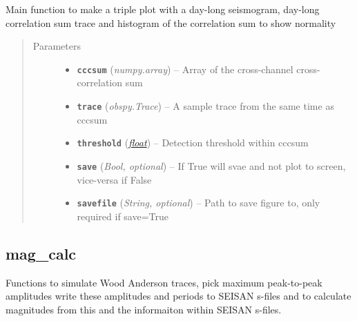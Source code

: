 \documentclass[a4paper,10pt,english]{sphinxmanual}
\begin{document}

\begin{fulllineitems}
\label{utils:EQcorrscan_plotting.triple_plot}
Main function to make a triple plot with a day-long seismogram, day-long
correlation sum trace and histogram of the correlation sum to show normality
\begin{quote}\begin{description}
\item[{Parameters}] \leavevmode\begin{itemize}
\item {} 
\textbf{\texttt{cccsum}} (\emph{numpy.array}) -- Array of the cross-channel cross-correlation sum

\item {} 
\textbf{\texttt{trace}} (\emph{obspy.Trace}) -- A sample trace from the same time as cccsum

\item {} 
\textbf{\texttt{threshold}} (\href{https://docs.python.org/library/functions.html\#float}{\emph{float}}) -- Detection threshold within cccsum

\item {} 
\textbf{\texttt{save}} (\emph{Bool, optional}) -- If True will svae and not plot to screen, vice-versa if False

\item {} 
\textbf{\texttt{savefile}} (\emph{String, optional}) -- Path to save figure to, only required if save=True

\end{itemize}

\end{description}\end{quote}

\end{fulllineitems}



\subsection{mag\_calc}
\label{utils:module-mag_calc}\label{utils:mag-calc}
Functions to simulate Wood Anderson traces, pick maximum peak-to-peak amplitudes
write these amplitudes and periods to SEISAN s-files and to calculate magnitudes
from this and the informaiton within SEISAN s-files.
\end{document}
